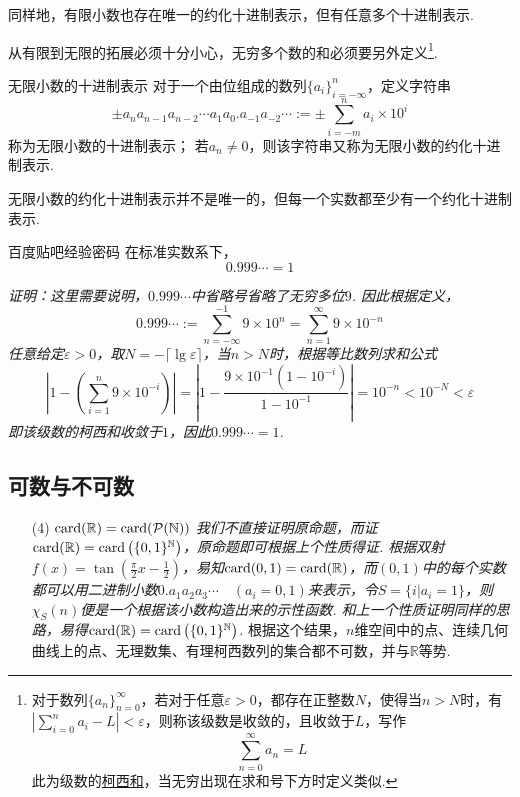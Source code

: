 \documentclass[main.tex]{subfiles}
\begin{document}
同样地，有限小数也存在唯一的约化十进制表示，但有任意多个十进制表示.

从有限到无限的拓展必须十分小心，无穷多个数的和必须要另外定义\footnote{对于数列\(\{a_n\}_{n=0}^{\infty}\)，若对于任意\(\varepsilon > 0\)，都存在正整数\(N\)，使得当\(n>N\)时，有\(\displaystyle{\left|\sum_{i=0}^{n}a_i-L\right| < \varepsilon}\)，则称该级数是收敛的，且收敛于\(L\)，写作\[\sum_{n=0}^{\infty}a_n=L\]此为级数的\uline{柯西和}，当无穷出现在求和号下方时定义类似.}.

\begin{definition}{无限小数的十进制表示}
    对于一个由位组成的数列\(\{a_i\}_{i=-\infty}^n\)，定义字符串
    \[\pm a_n a_{n-1} a_{n-2} \cdots a_1 a_0.a_{-1} a_{-2} \cdots := \pm \sum_{i=-m}^{n} a_i \times 10^i\]
    称为无限小数的十进制表示；
    \newline
    若\(a_n \neq 0\)，则该字符串又称为无限小数的约化十进制表示.
\end{definition}

无限小数的约化十进制表示并不是唯一的，但每一个实数都至少有一个约化十进制表示.

\begin{proposition}{百度贴吧经验密码}
    在标准实数系下，
    \[0.999\cdots = 1\]
\end{proposition}
\textit{
    证明：这里需要说明，\(0.999\cdots\)中省略号省略了无穷多位\(9\). 因此根据定义，
    \[0.999\cdots := \sum_{n=-\infty}^{-1} 9 \times 10^{n} = \sum_{n=1}^{\infty} 9 \times 10^{-n}\]
    任意给定\(\varepsilon > 0\)，取\(N=-\lceil\lg \varepsilon\rceil\)，当\(n>N\)时，根据等比数列求和公式
    \[\left| 1-\left(\sum_{i=1}^{n} 9 \times 10^{-i}\right) \right| = \left| 1-\frac{9\times 10^{-1}(1-10^{-i})}{1-10^{-1}} \right| =10^{-n}<10^{-N}<\varepsilon\]
    即该级数的柯西和收敛于\(1\)，因此\(0.999\cdots = 1\).
}


\subsection{可数与不可数}

\begin{itemize}
    \item [(4)] \({\rm card}(\mathbb{R}) = {\rm card}(\mathcal{P}(\mathbb{N})) \)
    \newline
    \textit{
        我们不直接证明原命题，而证\({\rm card}(\mathbb{R})={\rm card}\left(\{0,1\}^\mathbb{N}\right)\)，原命题即可根据上个性质得证.
        \newline
        根据双射\(f(x)=\tan\left(\frac{\pi}{2}x-\frac{1}{2}\right)\)，易知\({\rm card}(0,1)={\rm card}(\mathbb{R})\)，而\((0,1)\)中的每个实数都可以用二进制小数\(0.a_1a_2a_3\cdots\quad(a_i=0,1)\)来表示，令\(S=\{i|a_i=1\}\)，则\(\chi_S(n)\)便是一个根据该小数构造出来的示性函数. 和上一个性质证明同样的思路，易得\({\rm card}(\mathbb{R})={\rm card}\left(\{0,1\}^\mathbb{N}\right)\).
    }
    根据这个结果，\(n\)维空间中的点、连续几何曲线上的点、无理数集、有理柯西数列的集合都不可数，并与\(\mathbb{R}\)等势.
    
\end{itemize}
\end{document}
